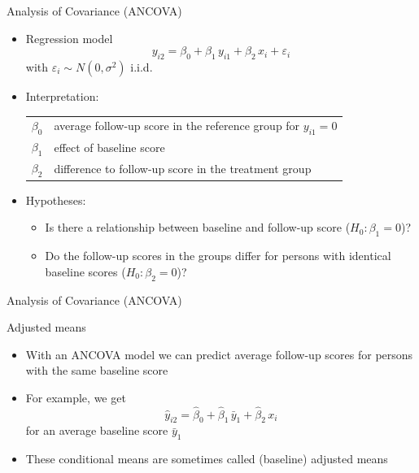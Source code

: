 \documentclass[aspectratio=169]{beamer}
\begin{document}
\begin{frame}[<+->]{Analysis of Covariance (ANCOVA)}
\begin{itemize}
  \item Regression model
    \[
      y_{i2} = \beta_0 + \beta_1 \, y_{i1} + \beta_2 \, x_i + \varepsilon_i
    \]
    with $\varepsilon_i \sim N(0, \sigma^2)$ i.i.d.
  \item Interpretation:
    \begin{tabular}{lp{10cm}}
    $\beta_0$ & average follow-up score in the reference group for $y_{i1} = 0$\\
    $\beta_1$ & effect of baseline score\\
    $\beta_2$ & difference to follow-up score in the treatment group
    \end{tabular}
  \item Hypotheses:
    \begin{itemize}
        \item Is there a relationship between baseline and follow-up score ($H_0\colon \beta_1 = 0$)?
        \item Do the follow-up scores in the groups differ for persons with
          identical baseline scores ($H_0\colon \beta_2 = 0$)?
    \end{itemize}
\end{itemize}
\end{frame}


\begin{frame}{Analysis of Covariance (ANCOVA)}
\begin{center}
\end{center}
\end{frame}


\begin{frame}{Adjusted means}
\begin{itemize}
  \item With an ANCOVA model we can predict average follow-up scores for
    persons with the same baseline score
  \item For example, we get
    \[
      \hat{y}_{i2} = \hat{\beta}_0 + \hat{\beta}_1 \, \bar{y}_1 +
                     \hat{\beta}_2 \, x_i
    \]
    for an average baseline score $\bar{y}_1$
\item These conditional means are sometimes called (baseline) adjusted
  means
\end{itemize}
\end{frame}
\end{document}
